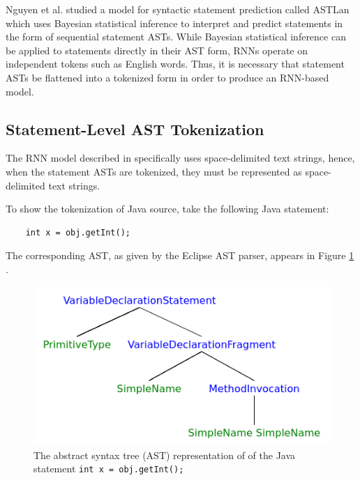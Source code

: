 \documentclass{article}
\begin{document}
Nguyen et al. \cite{Nguyen} studied a model for syntactic statement prediction 
called ASTLan which uses Bayesian statistical inference to interpret and 
predict statements in the form of sequential statement ASTs. While Bayesian 
statistical inference can be applied to statements directly in their AST 
form, RNNs operate on independent tokens such as English words. Thus, it is 
necessary that statement ASTs be flattened into a tokenized form in order to 
produce an RNN-based model.

\subsection{Statement-Level AST Tokenization}

The RNN model described in \citet{LSTMArticle} specifically uses space-delimited 
text strings, hence, when the statement ASTs are tokenized, they 
must be represented as space-delimited text strings.

To show the tokenization of Java source, take the following Java statement:

\begin{verbatim}
    int x = obj.getInt();
\end{verbatim}

The corresponding AST, as given by the Eclipse AST parser, appears in Figure \ref{ast-figure} \cite{Eclipse}.

\begin{figure}[ht]
\vskip 0.2in
\begin{center}
\centerline{\includegraphics[width=\columnwidth]{ast.png}}
\caption{The abstract syntax tree (AST) representation of of the Java statement \texttt{int x = obj.getInt();}}
\label{ast-figure}
\end{center}
\vskip -0.2in
\end{figure} 
\end{document}
